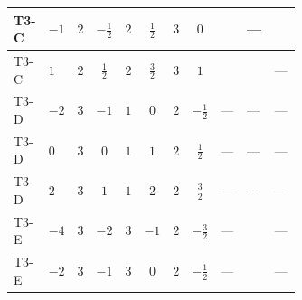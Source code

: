 \documentclass[8pt]{article}
\begin{document}
\begin{landscape}
\begin{longtable}{@{}llcccccc >{\raggedright\arraybackslash}p{0.21\linewidth} >{\raggedright\arraybackslash}p{0.21\linewidth} >{\raggedright\arraybackslash}p{0.21\linewidth}@{}}
\midrule
T3-C & $-1$ & $2$ & $-\frac{1}{2}$ & $2$ & $\frac{1}{2}$ & $3$ & $0$ & \scriptsize\adjustbox{max width=\linewidth}{$\begin{gathered} +\frac{3}{2} T_{\nu}^{(2)} \left({y_2}\right)_{ij}\end{gathered}$} & --- & \scriptsize\adjustbox{max width=\linewidth}{$\begin{gathered} \frac{3}{2} \operatorname{Tr}\!\left({y_2}\,\left({y_1}\right)^{\dagger}\right) \left({y_1}\right)_{ij}\end{gathered}$} \\
\midrule
T3-C & $1$ & $2$ & $\frac{1}{2}$ & $2$ & $\frac{3}{2}$ & $3$ & $1$ & \scriptsize\adjustbox{max width=\linewidth}{$\begin{gathered} \frac{3}{2} T_{\nu}^{(2)} \left({y_2}\right)_{ij}\end{gathered}$} & \scriptsize\adjustbox{max width=\linewidth}{$\begin{gathered} +\frac{1}{4} (3 \left({y_1}\,\left({y_1}\right)^{\dagger}\,{y_2}\right)_{ij}+2 \left({Y_e}\,\left({Y_e}\right)^{\dagger}\,{y_2}\right)_{ij}+5 \left({y_2}\,\left({y_2}\right)^{\dagger}\,{y_2}\right)_{ij})\end{gathered}$} & --- \\
\midrule
T3-D & $-2$ & $3$ & $-1$ & $1$ & $0$ & $2$ & $-\frac{1}{2}$ & --- & --- & --- \\
\midrule
T3-D & $0$ & $3$ & $0$ & $1$ & $1$ & $2$ & $\frac{1}{2}$ & --- & --- & --- \\
\midrule
T3-D & $2$ & $3$ & $1$ & $1$ & $2$ & $2$ & $\frac{3}{2}$ & --- & --- & --- \\
\midrule
T3-E & $-4$ & $3$ & $-2$ & $3$ & $-1$ & $2$ & $-\frac{3}{2}$ & --- & \scriptsize\adjustbox{max width=\linewidth}{$\begin{gathered} +\frac{1}{4} (3 \left({y_1}\,\left({y_1}\right)^{\dagger}\,{y_2}\right)_{ij}+2 \left({Y_e}\,\left({Y_e}\right)^{\dagger}\,{y_2}\right)_{ij}+6 \left({y_2}\,\left({y_2}\right)^{\dagger}\,{y_2}\right)_{ij})\end{gathered}$} & --- \\
\midrule
T3-E & $-2$ & $3$ & $-1$ & $3$ & $0$ & $2$ & $-\frac{1}{2}$ & --- & \scriptsize\adjustbox{max width=\linewidth}{$\begin{gathered} +\frac{1}{4} (3 \left({y_1}\,\left({y_1}\right)^{\dagger}\,{y_2}\right)_{ij}+2 \left({Y_e}\,\left({Y_e}\right)^{\dagger}\,{y_2}\right)_{ij}+6 \left({y_2}\,\left({y_2}\right)^{\dagger}\,{y_2}\right)_{ij})\end{gathered}$} & --- \\

\end{longtable}
\end{landscape}
\end{document}

